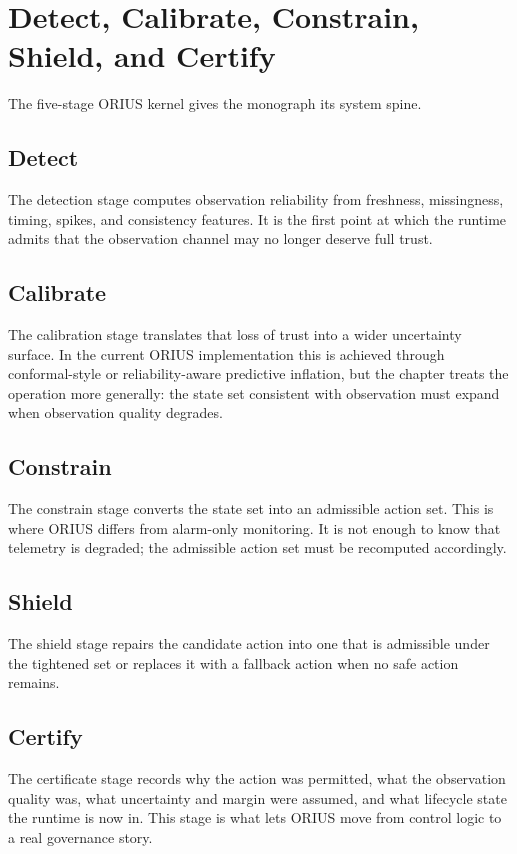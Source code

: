 \chapter{Detect, Calibrate, Constrain, Shield, and Certify}
\label{ch:dc3s-kernel}

The five-stage ORIUS kernel gives the monograph its system spine.

\section{Detect}
The detection stage computes observation reliability from freshness, missingness,
timing, spikes, and consistency features.  It is the first point at which the runtime
admits that the observation channel may no longer deserve full trust.

\section{Calibrate}
The calibration stage translates that loss of trust into a wider uncertainty surface.
In the current ORIUS implementation this is achieved through conformal-style or
reliability-aware predictive inflation, but the chapter treats the operation more
generally: the state set consistent with observation must expand when observation
quality degrades.

\section{Constrain}
The constrain stage converts the state set into an admissible action set.  This is
where ORIUS differs from alarm-only monitoring.  It is not enough to know that
telemetry is degraded; the admissible action set must be recomputed accordingly.

\section{Shield}
The shield stage repairs the candidate action into one that is admissible under the
tightened set or replaces it with a fallback action when no safe action remains.

\section{Certify}
The certificate stage records why the action was permitted, what the observation
quality was, what uncertainty and margin were assumed, and what lifecycle state the
runtime is now in.  This stage is what lets ORIUS move from control logic to a real
governance story.
